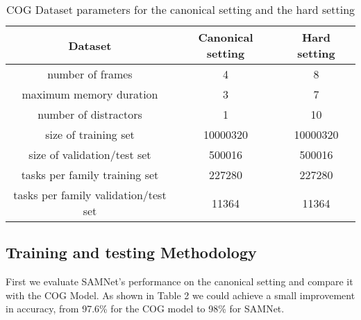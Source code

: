 \begin{table}[!t]
	\centering
	\caption{COG Dataset parameters for the canonical setting and the hard setting  }
	\begin{tabular}{ccc}
		\toprule
		Dataset       &    Canonical setting   & Hard setting   \\
		
		\midrule
		
		number of frames      &    4  &  8      \\
		
		\midrule
		
		maximum memory duration      &    3   & 7      \\
		
		\midrule
		
		number of distractors     &    1   & 10    \\
		
		\midrule
		
		size of training set    &    10000320  & 10000320      \\
		
		\midrule
		
		size of validation/test set    &    500016   & 500016      \\
		
		\midrule
		
		tasks per family  training set   &    227280  & 227280    \\
		
		\midrule
		
		tasks per family  validation/test set   &    11364   & 11364      \\
		
	
		
		
		
		
		
	
	   \bottomrule
	
	\end{tabular}
	
	\label{tab:parameters}
\end{table}


\subsection{Training and testing Methodology}

First we evaluate SAMNet's performance on the canonical setting and compare it with the COG Model. As shown in Table 2 we could achieve a small improvement in accuracy, from 97.6\% for the COG model to 98\% for SAMNet.

